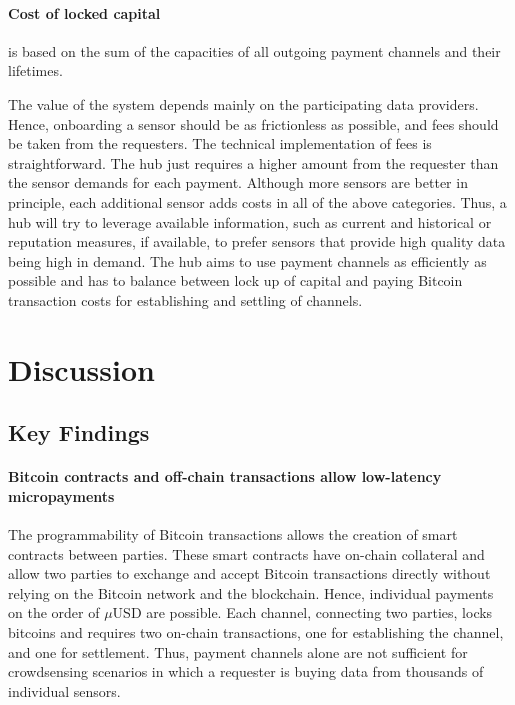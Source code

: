 \paragraph{Cost of locked capital} is based on the sum of the capacities of all outgoing payment channels and their lifetimes.

The value of the system depends mainly on the participating data providers. Hence, onboarding a sensor should be as frictionless as possible, and fees should be taken from the requesters. The technical implementation of fees is straightforward. The hub just requires a higher amount from the requester than the sensor demands for each payment. Although more sensors are better in principle, each additional sensor adds costs in all of the above categories. Thus, a hub will try to leverage available information, such as current and historical or reputation measures, if available, to prefer sensors that provide high quality data being high in demand. The hub aims to use payment channels as efficiently as possible and has to balance between lock up of capital and paying Bitcoin transaction costs for establishing and settling of channels.


\section{Discussion}
\label{sec:trust-lessdiscussion}

\subsection{Key Findings}

\paragraph{Bitcoin contracts and off-chain transactions allow low-latency micropayments}

The programmability of Bitcoin transactions allows the creation of smart contracts between parties. These smart contracts have on-chain collateral and allow two parties to exchange and accept Bitcoin transactions directly without relying on the Bitcoin network and the blockchain. Hence, individual payments on the order of $\mu$USD are possible. Each channel, connecting two parties, locks bitcoins and requires two on-chain transactions, one for establishing the channel, and one for settlement. Thus, payment channels alone are not sufficient for crowdsensing scenarios in which a requester is buying data from thousands of individual sensors. 

